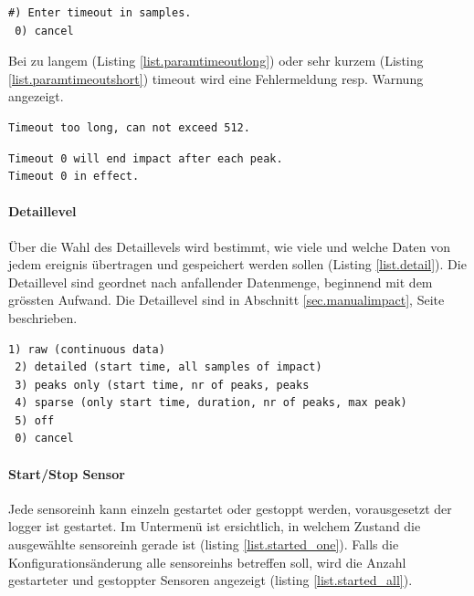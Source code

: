 \begin{lstlisting}[caption=Untermenü Timeout, label=list.paramtimeout]
 #) Enter timeout in samples.
 0) cancel
\end{lstlisting}

Bei zu langem (Listing \ref{list.paramtimeoutlong}) oder sehr kurzem (Listing \ref{list.paramtimeoutshort}) \gls{timeout} wird eine Fehlermeldung resp. Warnung angezeigt.

\begin{lstlisting}[caption=Fehlermeldung zu langer Timeout, label=list.paramtimeoutlong]
Timeout too long, can not exceed 512.
\end{lstlisting}

\begin{lstlisting}[caption=Warnung kurzer Timeout, label=list.paramtimeoutshort]
Timeout 0 will end impact after each peak.
Timeout 0 in effect.
\end{lstlisting}

\paragraph{Detaillevel} Über die Wahl des Detaillevels wird bestimmt, wie viele und welche Daten von jedem \gls{ereignis} übertragen und gespeichert werden sollen (Listing \ref{list.detail}). Die Detaillevel sind geordnet nach anfallender Datenmenge, beginnend mit dem grössten Aufwand. Die Detaillevel sind in Abschnitt \ref{sec.manualimpact}, Seite \pageref{sec.manualimpact} beschrieben.

\begin{lstlisting}[caption=Untermenü Detail-Level, label=list.detail]
 1) raw (continuous data)
 2) detailed (start time, all samples of impact)
 3) peaks only (start time, nr of peaks, peaks
 4) sparse (only start time, duration, nr of peaks, max peak)
 5) off
 0) cancel
\end{lstlisting}

\paragraph{Start/Stop Sensor} Jede \gls{sensoreinh} kann einzeln gestartet oder gestoppt werden, vorausgesetzt der \gls{logger} ist gestartet. Im Untermenü ist ersichtlich, in welchem Zustand die ausgewählte \gls{sensoreinh} gerade ist (listing \ref{list.started_one}). Falls die Konfigurationsänderung alle \glspl{sensoreinh} betreffen soll, wird die Anzahl gestarteter und gestoppter Sensoren angezeigt (listing \ref{list.started_all}).

